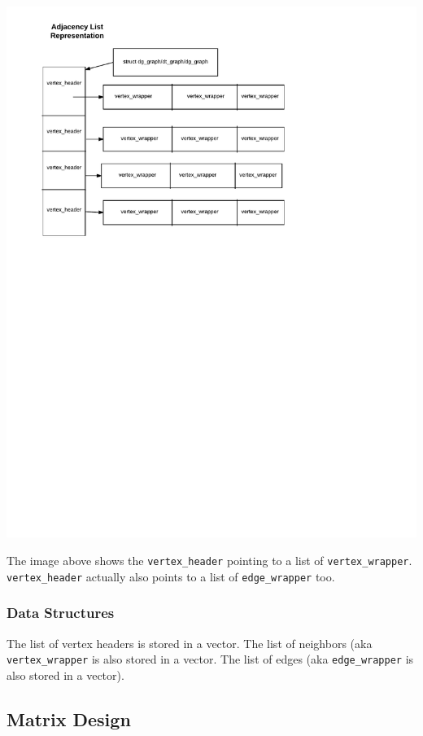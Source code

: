 \documentclass{article}
\begin{document}
\includegraphics{al}

The image above shows the \texttt{vertex\_header} pointing to a list of \texttt{vertex\_wrapper}. \texttt{vertex\_header} actually also points to a list of \texttt{edge\_wrapper} too. 
\subsubsection{Data Structures}
The list of vertex headers is stored in a vector. The list of neighbors (aka \texttt{vertex\_wrapper} is also stored in a vector. The list of edges (aka \texttt{edge\_wrapper} is also stored in a vector).

\subsection{Matrix Design}
\end{document}
